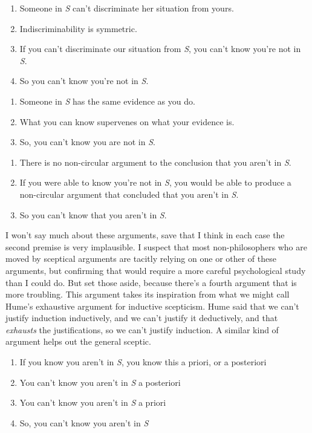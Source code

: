 \documentclass[
  10pt,
  letterpaper,
  DIV=11,
  numbers=noendperiod,
  twoside]{scrartcl}
\providecommand{\tightlist}{%
  \setlength{\itemsep}{0pt}\setlength{\parskip}{0pt}}\usepackage{longtable,booktabs,array}
\begin{document}
\begin{enumerate}
\def\labelenumi{\arabic{enumi}.}
\tightlist
\item
  Someone in \emph{S} can't discriminate her situation from yours.
\item
  Indiscriminability is symmetric.
\item
  If you can't discriminate our situation from \emph{S}, you can't know
  you're not in \emph{S}.
\item
  So you can't know you're not in \emph{S}.
\end{enumerate}

\begin{enumerate}
\def\labelenumi{\arabic{enumi}.}
\tightlist
\item
  Someone in \emph{S} has the same evidence as you do.
\item
  What you can know supervenes on what your evidence is.
\item
  So, you can't know you are not in \emph{S}.
\end{enumerate}

\begin{enumerate}
\def\labelenumi{\arabic{enumi}.}
\tightlist
\item
  There is no non-circular argument to the conclusion that you aren't in
  \emph{S}.
\item
  If you were able to know you're not in \emph{S}, you would be able to
  produce a non-circular argument that concluded that you aren't in
  \emph{S}.
\item
  So you can't know that you aren't in \emph{S}.
\end{enumerate}

I won't say much about these arguments, save that I think in each case
the second premise is very implausible. I suspect that most
non-philosophers who are moved by sceptical arguments are tacitly
relying on one or other of these arguments, but confirming that would
require a more careful psychological study than I could do. But set
those aside, because there's a fourth argument that is more troubling.
This argument takes its inspiration from what we might call Hume's
exhaustive argument for inductive scepticism. Hume said that we can't
justify induction inductively, and we can't justify it deductively, and
that \emph{exhausts} the justifications, so we can't justify induction.
A similar kind of argument helps out the general sceptic.

\begin{enumerate}
\def\labelenumi{\arabic{enumi}.}
\tightlist
\item
  If you know you aren't in \emph{S}, you know this a priori, or a
  posteriori
\item
  You can't know you aren't in \emph{S} a posteriori
\item
  You can't know you aren't in \emph{S} a priori
\item
  So, you can't know you aren't in \emph{S}
\end{enumerate}
\end{document}
